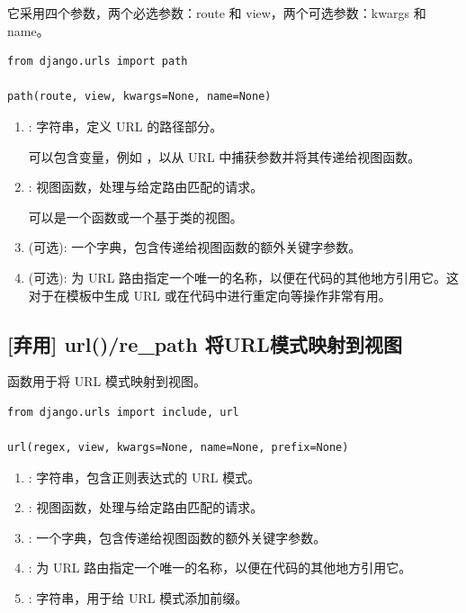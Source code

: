 它采用四个参数，两个必选参数：route 和 view，两个可选参数：kwargs 和 name。
\begin{lstlisting}[style=demostyle,numbers=none]
from django.urls import path

path(route, view, kwargs=None, name=None)
\end{lstlisting}  
\begin{enumerate}[label=\arabic*)]
  \item {}: 字符串，定义 URL 的路径部分。
  
  可以包含变量，例如 ，以从 URL 中捕获参数并将其传递给视图函数。

  \item {}: 视图函数，处理与给定路由匹配的请求。
  
  可以是一个函数或一个基于类的视图。
  
  \item {}(可选): 一个字典，包含传递给视图函数的额外关键字参数。
  
  \item {}(可选): 为 URL 路由指定一个唯一的名称，以便在代码的其他地方引用它。这对于在模板中生成 URL 或在代码中进行重定向等操作非常有用。
\end{enumerate}

\subsection{[弃用] url()/re\_path 将URL模式映射到视图}
函数用于将 URL 模式映射到视图。
\begin{lstlisting}[style=demostyle,numbers=none]
from django.urls import include, url

url(regex, view, kwargs=None, name=None, prefix=None)
\end{lstlisting}
\begin{enumerate}[label=\arabic*)]
  \item {}: 字符串，包含正则表达式的 URL 模式。
  \item {}: 视图函数，处理与给定路由匹配的请求。
  \item {}: 一个字典，包含传递给视图函数的额外关键字参数。
  \item {}: 为 URL 路由指定一个唯一的名称，以便在代码的其他地方引用它。
  \item {}: 字符串，用于给 URL 模式添加前缀。
\end{enumerate}

